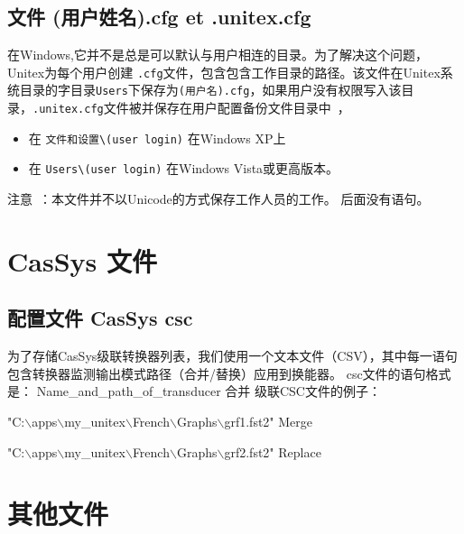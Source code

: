 \subsection{文件 (用户姓名).cfg et .unitex.cfg}

\bigskip
在Windows,它并不是总是可以默认与用户相连的目录。为了解决这个问题，Unitex为每个用户创建 \verb+.cfg+文件，包含包含工作目录的路径。该文件在Unitex系统目录的字目录\verb+Users+下保存为\verb+(用户名).cfg+，如果用户没有权限写入该目录，\verb+.unitex.cfg+文件被并保存在用户配置备份文件目录中~，

\begin{itemize}
\item 在 \verb+文件和设置\(user login)+ 在Windows XP上
\item 在 \verb+Users\(user login)+ 在Windows Vista或更高版本。
\end{itemize}

\bigskip
\noindent
注意~：本文件并不以Unicode的方式保存工作人员的工作。
后面没有语句。

\section{ CasSys 文件}

\subsection{配置文件 CasSys csc}
为了存储CasSys级联转换器列表，我们使用一个文本文件（CSV），其中每一语句包含转换器监测输出模式路径（合并/替换）应用到换能器。
csc文件的语句格式是： Name\_and\_path\_of\_transducer 合并
级联CSC文件的例子：


\ttfamily
"C:$\backslash$apps$\backslash$my\_unitex$\backslash$French$\backslash$Graphs$\backslash$grf1.fst2" Merge

"C:$\backslash$apps$\backslash$my\_unitex$\backslash$French$\backslash$Graphs$\backslash$grf2.fst2" Replace
\rmfamily

\section{其他文件}

